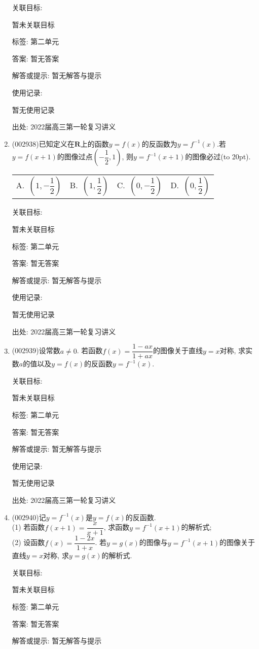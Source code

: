 \documentclass[10pt,a4paper]{article}
\newcommand{\bracket}[1]{(\hbox to #1pt{})}
\newcommand{\fourch}[4]{\par\begin{tabular}{p{.23\textwidth}p{.23\textwidth}p{.23\textwidth}p{.23\textwidth}}
A.~#1 &B.~#2& C.~#3& D.~#4
\end{tabular}}
\begin{document}
\begin{enumerate}[1.]
关联目标:

暂未关联目标



标签: 第二单元

答案: 暂无答案

解答或提示: 暂无解答与提示

使用记录:

暂无使用记录


出处: 2022届高三第一轮复习讲义
\item { (002938)}已知定义在$\mathbf{R}$上的函数$y=f(x)$的反函数为$y=f^{-1}(x)$.若$y=f(x+1)$的图像过点$(-\dfrac 12,1)$, 则$y=f^{-1}(x+1)$的图像必过\bracket{20}.
\fourch{$(1,-\dfrac 12)$}{$(1,\dfrac 12)$}{$(0,-\dfrac 12)$}{$(0,\dfrac 12)$}


关联目标:

暂未关联目标



标签: 第二单元

答案: 暂无答案

解答或提示: 暂无解答与提示

使用记录:

暂无使用记录


出处: 2022届高三第一轮复习讲义
\item { (002939)}设常数$a\ne 0$. 若函数$f(x)=\dfrac{1-ax}{1+ax}$的图像关于直线$y=x$对称, 求实数$a$的值以及$y=f(x)$的反函数$y=f^{-1}(x)$.


关联目标:

暂未关联目标



标签: 第二单元

答案: 暂无答案

解答或提示: 暂无解答与提示

使用记录:

暂无使用记录


出处: 2022届高三第一轮复习讲义
\item { (002940)}记$y=f^{-1}(x)$是$y=f(x)$的反函数.\\
(1) 若函数$f(x+1)=\dfrac x{x+1}$, 求函数$y=f^{-1}(x+1)$的解析式;\\
(2) 设函数$f(x)=\dfrac{1-2x}{1+x}$. 若$y=g(x)$的图像与$y=f^{-1}(x+1)$的图像关于直线$y=x$对称, 求$y=g(x)$的解析式.


关联目标:

暂未关联目标



标签: 第二单元

答案: 暂无答案

解答或提示: 暂无解答与提示


\end{enumerate}
\end{document}
